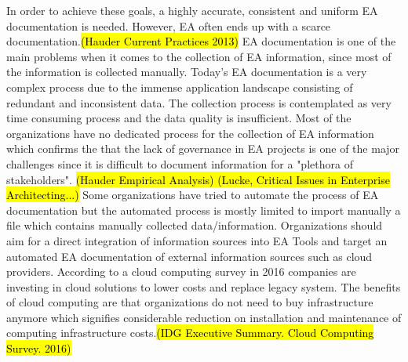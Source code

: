 In order to achieve these goals, a highly accurate, consistent and uniform EA documentation is needed. However, EA often ends up with a scarce documentation.\hl{(Hauder Current Practices 2013)} EA documentation is one of the main problems when it comes to the collection of EA information, since most of the information is collected manually. Today's EA documentation is a very complex process due to the immense application landscape consisting of redundant and inconsistent data. The collection process is contemplated as very time consuming  process and the data quality is insufficient. %
Most of the organizations have no dedicated process for the collection of EA information which confirms the that the lack of governance in EA projects is one of the major challenges since it is difficult to document information for a "plethora of stakeholders". \hl{(Hauder Empirical Analysis) (Lucke, Critical Issues in Enterprise Architecting...) } Some organizations have tried to automate the process of EA documentation but the automated process is mostly limited to import manually a file which contains manually collected data/information. 
Organizations should aim for a direct integration of information sources into EA Tools and target an automated EA documentation of external information sources such as cloud providers. 
According to a cloud computing survey in 2016 companies are investing in cloud solutions to lower costs and replace legacy system. The benefits of cloud computing are that organizations do not need to buy infrastructure anymore which signifies considerable reduction on installation and maintenance of computing infrastructure costs.\hl{(IDG Executive Summary. Cloud Computing Survey. 2016)}


